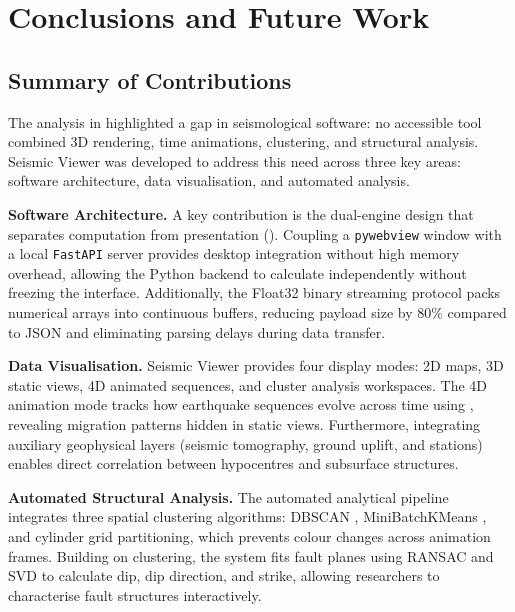 
\chapter{Conclusions and Future Work}
\label{ch:conclusions}

\section{Summary of Contributions}
\label{sec:contributions}

The analysis in  highlighted a gap in seismological software: no accessible tool combined 3D rendering, time animations, clustering, and structural analysis. Seismic Viewer was developed to address this need across three key areas: software architecture, data visualisation, and automated analysis.

\vspace{0.8em}
\textbf{Software Architecture.} A key contribution is the dual-engine design that separates computation from presentation (). Coupling a \texttt{pywebview} \cite{pywebview} window with a local \texttt{FastAPI} \cite{fastapi} server provides desktop integration without high memory overhead, allowing the Python backend to calculate independently without freezing the interface. Additionally, the Float32 binary streaming protocol packs numerical arrays into continuous buffers, reducing payload size by $80\%$ compared to JSON and eliminating parsing delays during data transfer.

\vspace{0.8em}
\textbf{Data Visualisation.} Seismic Viewer provides four display modes: 2D maps, 3D static views, 4D animated sequences, and cluster analysis workspaces. The 4D animation mode tracks how earthquake sequences evolve across time using , revealing migration patterns hidden in static views. Furthermore, integrating auxiliary geophysical layers (seismic tomography, ground uplift, and stations) enables direct correlation between hypocentres and subsurface structures.

\vspace{0.8em}
\textbf{Automated Structural Analysis.} The automated analytical pipeline integrates three spatial clustering algorithms: DBSCAN \cite{ester1996dbscan}, MiniBatchKMeans \cite{lloyd1982kmeans}, and cylinder grid partitioning, which prevents colour changes across animation frames. Building on clustering, the system fits fault planes using RANSAC \cite{fischler1981ransac} and SVD \cite{shakarji1998least} to calculate dip, dip direction, and strike, allowing researchers to characterise fault structures interactively.

